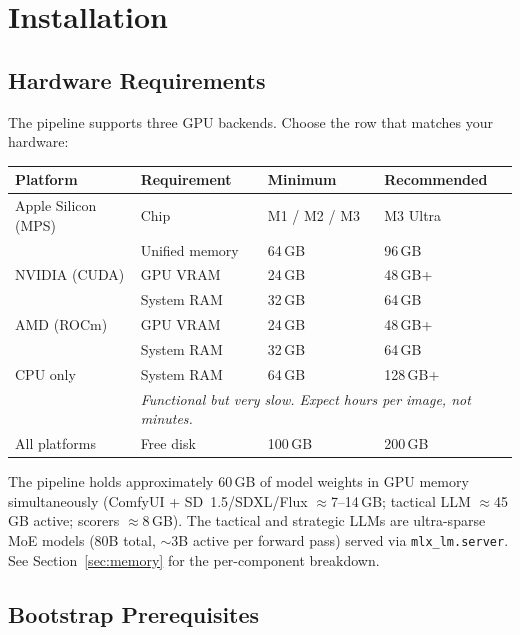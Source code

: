 \documentclass[11pt,letterpaper]{article}
\begin{document}
\section{Installation}

\subsection{Hardware Requirements}

The pipeline supports three GPU backends. Choose the row that matches your
hardware:

\begin{center}
\begin{tabular}{llll}
\toprule
\textbf{Platform} & \textbf{Requirement} & \textbf{Minimum} & \textbf{Recommended} \\
\midrule
Apple Silicon (MPS) & Chip            & M1 / M2 / M3       & M3 Ultra \\
                    & Unified memory  & 64\,GB             & 96\,GB \\
\midrule
NVIDIA (CUDA)       & GPU VRAM        & 24\,GB             & 48\,GB+ \\
                    & System RAM      & 32\,GB             & 64\,GB \\
\midrule
AMD (ROCm)          & GPU VRAM        & 24\,GB             & 48\,GB+ \\
                    & System RAM      & 32\,GB             & 64\,GB \\
\midrule
CPU only            & System RAM      & 64\,GB             & 128\,GB+ \\
                    & \multicolumn{3}{l}{\textit{Functional but very slow. Expect hours per image, not minutes.}} \\
\midrule
All platforms       & Free disk       & 100\,GB            & 200\,GB \\
\bottomrule
\end{tabular}
\end{center}

The pipeline holds approximately 60\,GB of model weights in GPU memory
simultaneously (ComfyUI + SD~1.5/SDXL/Flux $\approx$7--14\,GB; tactical LLM $\approx$45\,GB active;
scorers $\approx$8\,GB). The tactical and strategic LLMs are ultra-sparse MoE models
(80B total, $\sim$3B active per forward pass) served via \texttt{mlx\_lm.server}.
See Section~\ref{sec:memory} for the per-component breakdown.

\subsection{Bootstrap Prerequisites}
\end{document}
